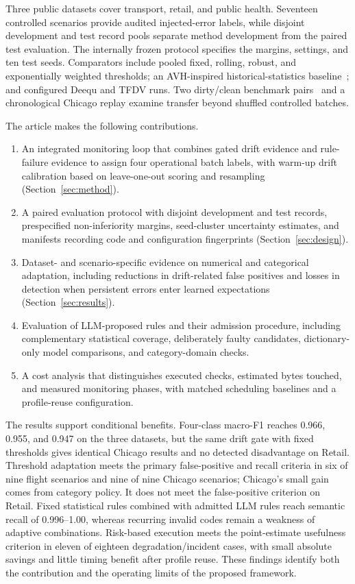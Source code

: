 Three public datasets cover transport, retail, and public health. Seventeen controlled scenarios provide audited injected-error labels, while disjoint development and test record pools separate method development from the paired test evaluation. The internally frozen protocol specifies the margins, settings, and ten test seeds. Comparators include pooled fixed, rolling, robust, and exponentially weighted thresholds; an AVH-inspired historical-statistics baseline~\cite{Tu2023}; and configured Deequ and TFDV runs. Two dirty/clean benchmark pairs~\cite{Mahdavi2019} and a chronological Chicago replay examine transfer beyond shuffled controlled batches.

The article makes the following contributions.
\begin{enumerate}
\item An integrated monitoring loop that combines gated drift evidence and rule-failure evidence to assign four operational batch labels, with warm-up drift calibration based on leave-one-out scoring and resampling (Section~\ref{sec:method}).
\item A paired evaluation protocol with disjoint development and test records, prespecified non-inferiority margins, seed-cluster uncertainty estimates, and manifests recording code and configuration fingerprints (Section~\ref{sec:design}).
\item Dataset- and scenario-specific evidence on numerical and categorical adaptation, including reductions in drift-related false positives and losses in detection when persistent errors enter learned expectations (Section~\ref{sec:results}).
\item Evaluation of LLM-proposed rules and their admission procedure, including complementary statistical coverage, deliberately faulty candidates, dictionary-only model comparisons, and category-domain checks.
\item A cost analysis that distinguishes executed checks, estimated bytes touched, and measured monitoring phases, with matched scheduling baselines and a profile-reuse configuration.
\end{enumerate}

The results support conditional benefits. Four-class macro-F1 reaches 0.966, 0.955, and 0.947 on the three datasets, but the same drift gate with fixed thresholds gives identical Chicago results and no detected disadvantage on Retail. Threshold adaptation meets the primary false-positive and recall criteria in six of nine flight scenarios and nine of nine Chicago scenarios; Chicago's small gain comes from category policy. It does not meet the false-positive criterion on Retail. Fixed statistical rules combined with admitted LLM rules reach semantic recall of 0.996--1.00, whereas recurring invalid codes remain a weakness of adaptive combinations. Risk-based execution meets the point-estimate usefulness criterion in eleven of eighteen degradation/incident cases, with small absolute savings and little timing benefit after profile reuse. These findings identify both the contribution and the operating limits of the proposed framework.

